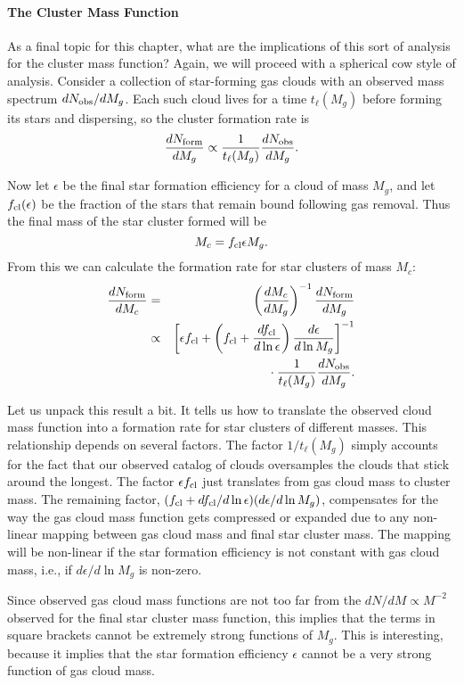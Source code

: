 \paragraph{The Cluster Mass Function}

As a final topic for this chapter, what are the implications of this sort of analysis for the cluster mass function? Again, we will proceed with a spherical cow style of analysis. Consider a collection of star-forming gas clouds with an observed mass spectrum $dN_{\rm obs}/dM_g$. Each such cloud lives for a time $t_\ell(M_g)$ before forming its stars and dispersing, so the cluster formation rate is
\begin{equation}
\frac{dN_{\rm form}}{dM_g} \propto \frac{1}{t_{\ell}(M_g)} \frac{dN_{\rm obs}}{dM_g}.
\end{equation}

Now let $\epsilon$ be the final star formation efficiency for a cloud of mass $M_g$, and let $f_{\rm cl}(\epsilon)$ be the fraction of the stars that remain bound following gas removal. Thus the final mass of the star cluster formed will be
\begin{equation}
M_c = f_{\rm cl} \epsilon M_g.
\end{equation}
From this we can calculate the formation rate for star clusters of mass $M_c$:
\begin{eqnarray}
\frac{dN_{\rm form}}{dM_c} & = & \left(\frac{dM_c}{dM_g}\right)^{-1} \frac{dN_{\rm form}}{dM_g} \\
& \propto & \left[\epsilon f_{\rm cl} + \left(f_{\rm cl}+ \frac{df_{\rm cl}}{d\ln \epsilon}\right) \frac{d\epsilon}{d\ln M_g}\right]^{-1} 
\nonumber \\
& & {} \cdot
\frac{1}{t_{\ell}(M_g)} \frac{dN_{\rm obs}}{dM_g}.
\end{eqnarray}

Let us unpack this result a bit. It tells us how to translate the observed cloud mass function into a formation rate for star clusters of different masses. This relationship depends on several factors. The factor $1/t_\ell(M_g)$ simply accounts for the fact that our observed catalog of clouds oversamples the clouds that stick around the longest. The factor $\epsilon f_{\rm cl}$ just translates from gas cloud mass to cluster mass. The remaining factor, $(f_{\rm cl} + df_{\rm cl}/d\ln\epsilon)(d\epsilon/d\ln M_g)$, compensates for the way the gas cloud mass function gets compressed or expanded due to any non-linear mapping between gas cloud mass and final star cluster mass. The mapping will be non-linear if the star formation efficiency is not constant with gas cloud mass, i.e., if $d\epsilon/d\ln M_g$ is non-zero.

Since observed gas cloud mass functions are not too far from the $dN/dM \propto M^{-2}$ observed for the final star cluster mass function, this implies that the terms in square brackets cannot be extremely strong functions of $M_g$. This is interesting, because it implies that the star formation efficiency $\epsilon$ cannot be a very strong function of gas cloud mass.
